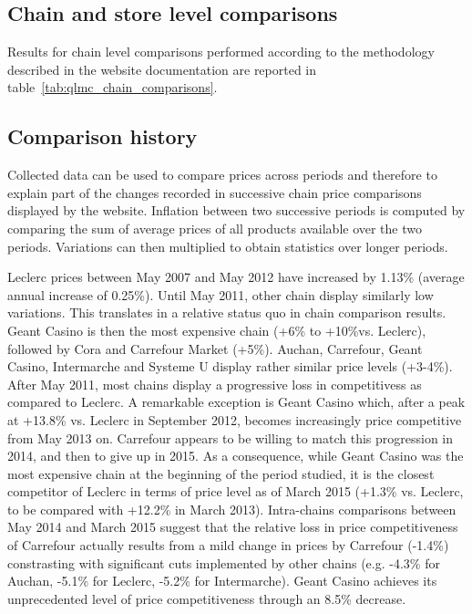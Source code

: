 \documentclass[english]{article}
\begin{document}
\subsection{Chain and store level comparisons}

Results for chain level comparisons performed according to the methodology described in the website documentation are reported in table~\ref{tab:qlmc_chain_comparisons}.

\subsection{Comparison history}

Collected data can be used to compare prices across periods and therefore to explain part of the changes recorded in successive chain price comparisons displayed by the website. Inflation between two successive periods is computed by comparing the sum of average prices of all products available over the two periods. Variations can then multiplied to obtain statistics over longer periods.

Leclerc prices between May 2007 and May 2012 have increased by 1.13\% (average annual increase of 0.25\%). Until May 2011, other chain display similarly low variations. This translates in a relative status quo in chain comparison results. Geant Casino is then the most expensive chain (+6\% to +10\%vs. Leclerc), followed by Cora and Carrefour Market (+5\%). Auchan, Carrefour, Geant Casino, Intermarche and Systeme U display rather similar price levels (+3-4\%).
After May 2011, most chains display a progressive loss in competitivess as compared to Leclerc. A remarkable exception is Geant Casino which, after a peak at +13.8\% vs. Leclerc in September 2012, becomes increasingly price competitive from May 2013 on. Carrefour appears to be willing to match this progression in 2014, and then to give up in 2015. As a consequence, while Geant Casino was the most expensive chain at the beginning of the period studied, it is the closest competitor of Leclerc in terms of price level as of March 2015 (+1.3\% vs. Leclerc, to be compared with +12.2\% in March 2013).
Intra-chains comparisons between May 2014 and March 2015 suggest that the relative loss in price competitiveness of Carrefour actually results from a mild change in prices by Carrefour (-1.4\%) constrasting with significant cuts implemented by other chains (e.g. -4.3\% for Auchan, -5.1\% for Leclerc, -5.2\% for Intermarche). Geant Casino achieves its unprecedented level of price competitiveness through an 8.5\% decrease.
\end{document}
